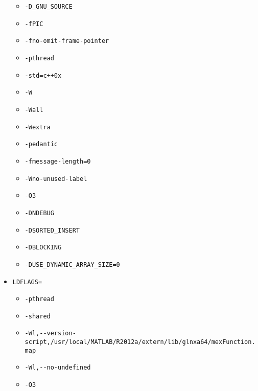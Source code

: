 \begin{itemize}[noitemsep]
\begin{itemize}[noitemsep]
            \item \lstinline|-D_GNU_SOURCE|
            \item \lstinline|-fPIC|
            \item \lstinline|-fno-omit-frame-pointer|
            \item \lstinline|-pthread|
            \item \lstinline|-std=c++0x|
            \item \lstinline|-W|
            \item \lstinline|-Wall|
            \item \lstinline|-Wextra|
            \item \lstinline|-pedantic|
            \item \lstinline|-fmessage-length=0|
            \item \lstinline|-Wno-unused-label|
            \item \lstinline|-O3|
            \item \lstinline|-DNDEBUG|
            \item \lstinline|-DSORTED_INSERT|
            \item \lstinline|-DBLOCKING|
            \item \lstinline|-DUSE_DYNAMIC_ARRAY_SIZE=0|
        \end{itemize}
    \item \lstinline|LDFLAGS=|
        \begin{itemize}[noitemsep]
            \item \lstinline|-pthread|
            \item \lstinline|-shared|
            \item \lstinline|-Wl,--version-script,/usr/local/MATLAB/R2012a/extern/lib/glnxa64/mexFunction.map|
            \item \lstinline|-Wl,--no-undefined|
            \item \lstinline|-O3|
        \end{itemize}
\end{itemize}

